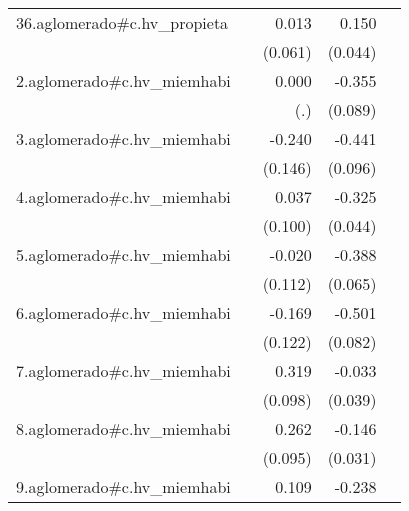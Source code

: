 {\begin{longtable}{l*{4}{D{.}{.}{-1}}}
\addlinespace
36.aglomerado#c.hv\_propieta&                     &       0.013         &       0.150\sym{***}&                     \\
            &                     &     (0.061)         &     (0.044)         &                     \\
\addlinespace
2.aglomerado#c.hv\_miemhabi&                     &       0.000         &      -0.355\sym{***}&                     \\
            &                     &         (.)         &     (0.089)         &                     \\
\addlinespace
3.aglomerado#c.hv\_miemhabi&                     &      -0.240         &      -0.441\sym{***}&                     \\
            &                     &     (0.146)         &     (0.096)         &                     \\
\addlinespace
4.aglomerado#c.hv\_miemhabi&                     &       0.037         &      -0.325\sym{***}&                     \\
            &                     &     (0.100)         &     (0.044)         &                     \\
\addlinespace
5.aglomerado#c.hv\_miemhabi&                     &      -0.020         &      -0.388\sym{***}&                     \\
            &                     &     (0.112)         &     (0.065)         &                     \\
\addlinespace
6.aglomerado#c.hv\_miemhabi&                     &      -0.169         &      -0.501\sym{***}&                     \\
            &                     &     (0.122)         &     (0.082)         &                     \\
\addlinespace
7.aglomerado#c.hv\_miemhabi&                     &       0.319\sym{**} &      -0.033         &                     \\
            &                     &     (0.098)         &     (0.039)         &                     \\
\addlinespace
8.aglomerado#c.hv\_miemhabi&                     &       0.262\sym{**} &      -0.146\sym{***}&                     \\
            &                     &     (0.095)         &     (0.031)         &                     \\
\addlinespace
9.aglomerado#c.hv\_miemhabi&                     &       0.109         &      -0.238\sym{***}&                     \\

\end{longtable}}
